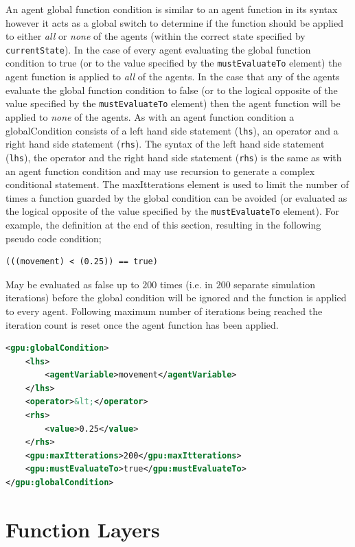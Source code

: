 \documentclass[11pt, a4paper, onecolumn, oneside]{report}
\begin{document}
An agent global function condition is similar to an agent function in its syntax however it acts as a global switch to determine if the function should be applied to either \emph{all} or \emph{none} of the agents (within the correct state specified by \verb|currentState|).
In the case of every agent evaluating the global function condition to true (or to the value specified by the \verb|mustEvaluateTo| element) the agent function is applied to \emph{all} of the agents.
In the case that any of the agents evaluate the global function condition to false (or to the logical opposite of the value specified by the \verb|mustEvaluateTo| element) then the agent function will be applied to \emph{none} of the agents.
As with an agent function condition a globalCondition consists of a left hand side statement (\verb|lhs|), an operator and a right hand side statement (\verb|rhs|).
The syntax of the left hand side statement (\verb|lhs|), the operator and the right hand side statement (\verb|rhs|) is the same as with an agent function condition and may use recursion to generate a complex conditional statement.
The maxItterations element is used to limit the number of times a function guarded by the global condition can be avoided (or evaluated as the logical opposite of the value specified by the \verb|mustEvaluateTo| element).
For example, the definition at the end of this section, resulting in the following pseudo code condition;

\begin{lstlisting}[language=C_]
(((movement) < (0.25)) == true)
\end{lstlisting}
May be evaluated as false up to $200$ times (i.e. in $200$ separate simulation iterations) before the global condition will be ignored and the function is applied to every agent.
Following maximum number of iterations being reached the iteration count is reset once the agent function has been applied.

\begin{lstlisting}[language=XML]
<gpu:globalCondition>
    <lhs>
        <agentVariable>movement</agentVariable>
    </lhs>
    <operator>&lt;</operator>
    <rhs>
        <value>0.25</value>
    </rhs>
    <gpu:maxItterations>200</gpu:maxItterations>
    <gpu:mustEvaluateTo>true</gpu:mustEvaluateTo>
</gpu:globalCondition>
\end{lstlisting}


\section{Function Layers}
\label{sec:26}
\end{document}
